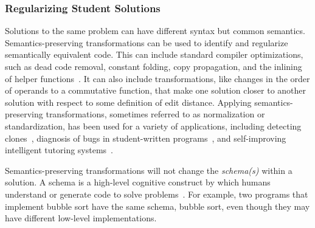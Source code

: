 

\subsubsection{Regularizing Student Solutions}


Solutions to the same problem can have different syntax but common semantics. Semantics-preserving transformations can be used to identify and regularize semantically equivalent code. This can include standard compiler optimizations, such as dead code removal, constant folding, copy propagation, and the inlining of helper functions~\cite{rivers2015data}. It can also include transformations, like changes in the order of operands to a commutative function, that make one solution closer to another solution with respect to some definition of edit distance. Applying semantics-preserving transformations, sometimes referred to as normalization or standardization, has been used for a variety of applications, including detecting clones~\cite{baxter,CCFinder}, diagnosis of bugs in student-written programs~\cite{xutransformation}, and self-improving intelligent tutoring systems~\cite{rivers2015data}. 

Semantics-preserving transformations will not change the {\it schema(s)} within a solution. A schema is a high-level cognitive construct by which humans understand or generate code to solve problems~\cite{Soloway1984}. For example, two programs that implement bubble sort have the same schema, bubble sort, even though they may have different low-level implementations. 

